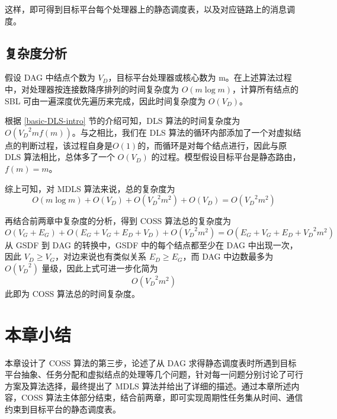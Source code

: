 这样，即可得到目标平台每个处理器上的静态调度表，以及对应链路上的消息调度。

\subsection{复杂度分析}
\label{COSS-complexity}
假设 DAG 中结点个数为 $V_D$，目标平台处理器或核心数为 m。在上述算法过程中，对处理器按连接数降序排列的时间复杂度为 $O(m\log{}m)$，计算所有结点的 SBL 可由一遍深度优先遍历来完成，因此时间复杂度为 $O(V_D)$。

根据 \ref{basic-DLS-intro} 节的介绍可知，DLS 算法的时间复杂度为 $O({V_D}^{2}m f(m))$。与之相比，我们在 DLS 算法的循环内部添加了一个对虚拟结点的判断过程，该过程自身是$O(1)$的，而循环是对每个结点进行，因此与原 DLS 算法相比，总体多了一个 $O(V_D)$ 的过程。模型假设目标平台是静态路由，$f(m)=m$。

综上可知，对 MDLS 算法来说，总的复杂度为 $$O(m\log{}m)+O(V_D)+O({V_D}^{2}m^2)+O(V_D)=O({V_D}^{2}m^2)$$

再结合前两章中复杂度的分析，得到 COSS 算法总的复杂度为
$$O(V_G+E_G)+O(E_G+V_G+E_D+V_D)+O({V_D}^{2}m^2)=O(E_G+V_G+E_D+{V_D}^{2}m^2)$$
从 GSDF 到 DAG 的转换中，GSDF 中的每个结点都至少在 DAG 中出现一次，因此 $V_D\geqslant{}V_G$，对边来说也有类似关系 $E_D\geqslant{}E_G$，而 DAG 中边数最多为 $O({V_D}^2)$ 量级，因此上式可进一步化简为$$O({V_D}^{2}m^2)$$ 此即为 COSS 算法总的时间复杂度。

\section{本章小结}

本章设计了 COSS 算法的第三步，论述了从 DAG 求得静态调度表时所遇到目标平台抽象、任务分配和虚拟结点的处理等几个问题，针对每一问题分别讨论了可行方案及算法选择，最终提出了 MDLS 算法并给出了详细的描述。通过本章所述内容，COSS 算法主体部分结束，结合前两章，即可实现周期性任务集从时间、通信约束到目标平台的静态调度表。


